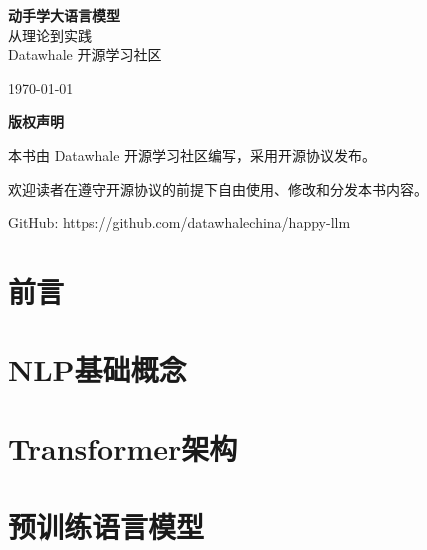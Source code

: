 \documentclass[12pt,a4paper]{book}
\begin{document}
\begin{titlepage}
    \centering
    \vspace*{2cm}
    
    {\Huge\bfseries 动手学大语言模型}\\[2cm]
    
    {\Large 从理论到实践}\\[1cm]
    
    {\large Datawhale 开源学习社区}\\[2cm]
    
    \vfill
    
    {\large \today}
\end{titlepage}

\newpage
\thispagestyle{empty}
\vspace*{2cm}
\begin{center}
    \textbf{版权声明}
    
    \vspace{1cm}
    
    本书由 Datawhale 开源学习社区编写，采用开源协议发布。
    
    欢迎读者在遵守开源协议的前提下自由使用、修改和分发本书内容。
    
    \vspace{1cm}
    
    GitHub: https://github.com/datawhalechina/happy-llm
\end{center}

\tableofcontents
\newpage

\chapter{前言}


\chapter{NLP基础概念}


\chapter{Transformer架构}


\chapter{预训练语言模型}

\end{document}
